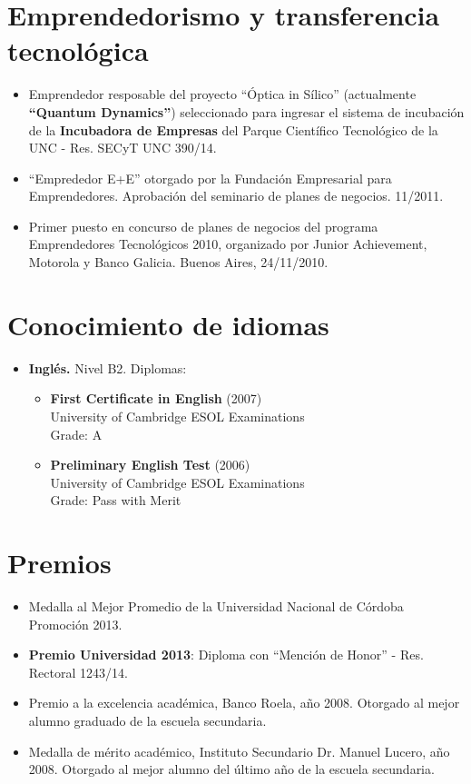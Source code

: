 \documentclass[10pt]{article}
\begin{document}
 \section{Emprendedorismo y transferencia tecnológica}
 \begin{itemize}
  \item Emprendedor resposable del proyecto ``Óptica in Sílico'' (actualmente {\bf ``Quantum Dynamics''}) seleccionado para ingresar el sistema de incubación de la {\bf Incubadora de Empresas} del Parque Científico Tecnológico de la UNC - Res. SECyT UNC 390/14.
  \item ``Emprededor E+E'' otorgado por la Fundación Empresarial para Emprendedores. Aprobación del seminario de planes de negocios. 11/2011.
  \item Primer puesto en concurso de planes de negocios del programa Emprendedores Tecnológicos 2010, organizado por Junior Achievement, Motorola y Banco Galicia. Buenos Aires, 24/11/2010.
 \end{itemize}

 \section{Conocimiento de idiomas}
\begin{itemize}
\item{\bf Inglés.} Nivel B2. Diplomas:
\begin{itemize}
\item {\bf First Certificate in English} (2007) \\
University of Cambridge ESOL Examinations\\
Grade: A
\item {\bf Preliminary English Test} (2006) \\
University of Cambridge ESOL Examinations \\
Grade: Pass with Merit
\end{itemize}
\end{itemize}
 
\section{Premios}
\begin{itemize}
\item Medalla al Mejor Promedio de la Universidad Nacional de Córdoba Promoción 2013.
\item {\bf Premio Universidad 2013}: Diploma con ``Mención de Honor'' - Res. Rectoral 1243/14.
\item {Premio a la excelencia académica}, Banco Roela, año 2008. Otorgado al mejor alumno graduado de la escuela secundaria.
\item {Medalla de mérito académico}, Instituto Secundario Dr. Manuel Lucero, año 2008. Otorgado al mejor alumno del último año de la escuela secundaria.
\end{itemize}
\end{document}

